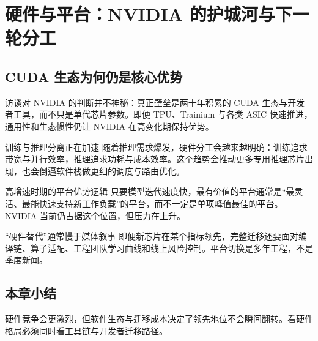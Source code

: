 \section{硬件与平台：NVIDIA 的护城河与下一轮分工}

\subsection{CUDA 生态为何仍是核心优势}

访谈对 NVIDIA 的判断并不神秘：真正壁垒是两十年积累的 CUDA 生态与开发者工具，而不只是单代芯片参数。即便 TPU、Trainium 与各类 ASIC 快速推进，通用性和生态惯性仍让 NVIDIA 在高变化期保持优势。

\begin{knowledgebox}{训练与推理分离正在加速}
随着推理需求爆发，硬件分工会越来越明确：训练追求带宽与并行效率，推理追求功耗与成本效率。这个趋势会推动更多专用推理芯片出现，也会倒逼软件栈做更细的调度与路由优化。
\end{knowledgebox}

\begin{importantbox}{高增速时期的平台优势逻辑}
只要模型迭代速度快，最有价值的平台通常是“最灵活、最能快速支持新工作负载”的平台，而不一定是单项峰值最佳的平台。NVIDIA 当前仍占据这个位置，但压力在上升。
\end{importantbox}

\begin{warningbox}{“硬件替代”通常慢于媒体叙事}
即便新芯片在某个指标领先，完整迁移还要面对编译链、算子适配、工程团队学习曲线和线上风险控制。平台切换是多年工程，不是季度新闻。
\end{warningbox}

\subsection{本章小结}

硬件竞争会更激烈，但软件生态与迁移成本决定了领先地位不会瞬间翻转。看硬件格局必须同时看工具链与开发者迁移路径。

